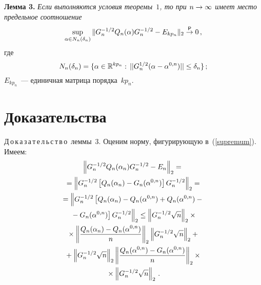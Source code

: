 \begin{multicols}{2}
\medskip

\noindent
\textbf{Лемма 3.}
\textit{Если выполняются условия теоремы~$1$, то при $n\hm\rightarrow\infty$ 
имеет место предельное соотношение}
\begin{gather}
\sup_{\alpha\in N_n(\delta_n)}\|G^{-1/2}_nQ_n(\alpha)G^{-1/2}_n-E_{kp_n}\|_2
\stackrel{{\sf P}}{\rightarrow}0\,,\label{supremum}
\end{gather}
где 
$$
N_n(\delta_n)\hm=\{\alpha\in\R^{kp_n}:\,||G^{1/2}_n(\alpha-\alpha^{0,n})||\hm\leq 
\delta_n\}\,;
$$
$E_{kp_n}$~--- единичная матрица порядка~$kp_n$.


\section{Доказательства}

\noindent
Д\,о\,к\,а\,з\,а\,т\,е\,л\,ь\,с\,т\,в\,о\ леммы~3.
Оценим норму, фигурирующую в~(\ref{supremum}). Имеем:
\begin{multline}
\left\|G^{-1/2}_nQ_n(\alpha_n)G^{-1/2}_n-E_n\right\|_2={}\\
{}=\left\|G^{-1/2}_n\left[Q_n(\alpha_n)-G_n(\alpha^{0,n})\right]G^{-1/2}_n\right\|_2={}\\
{}=\left\|G^{-1/2}_n\left[Q_n(\alpha_n)-Q_n(\alpha^{0,n})+
Q_n(\alpha^{0,n})-{}\right.\right.\\
\left.\left.{}-G_n(\alpha^{0,n})\right]G^{-1/2}_n\right\|_2\leq
\left\|G^{-1/2}_n\sqrt{n}\right\|_2\times{}\\
{}\times\left\|\displaystyle\frac{\displaystyle Q_n(\alpha_n)-Q_n(\alpha^{0,n})\mathstrut}{\displaystyle n\mathstrut}\right\|_2 
\left\|G^{-1/2}_n\sqrt{n}\right\|_2+{}\\
{}+\left\|G^{-1/2}_n\sqrt{n}\right\|_2 \left\|\displaystyle\frac{\displaystyle Q_n(\alpha^{0,n})-
G_n(\alpha^{0,n})\mathstrut}{\displaystyle n\mathstrut}\right\|_2\times{}\\
{}\times\left\|G^{-1/2}_n\sqrt{n}\right\|_2\,.\label{eq14}
\end{multline}


\end{multicols}
